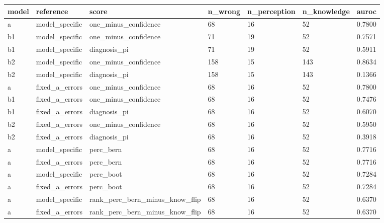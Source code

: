 \begin{tabular}{lllllll}
\hline
model & reference & score & n\_wrong & n\_perception & n\_knowledge & auroc \\
\hline
a & model\_specific & one\_minus\_confidence & 68 & 16 & 52 & 0.7800 \\
b1 & model\_specific & one\_minus\_confidence & 71 & 19 & 52 & 0.7571 \\
b1 & model\_specific & diagnosis\_pi & 71 & 19 & 52 & 0.5911 \\
b2 & model\_specific & one\_minus\_confidence & 158 & 15 & 143 & 0.8634 \\
b2 & model\_specific & diagnosis\_pi & 158 & 15 & 143 & 0.1366 \\
a & fixed\_a\_errors & one\_minus\_confidence & 68 & 16 & 52 & 0.7800 \\
b1 & fixed\_a\_errors & one\_minus\_confidence & 68 & 16 & 52 & 0.7476 \\
b1 & fixed\_a\_errors & diagnosis\_pi & 68 & 16 & 52 & 0.6070 \\
b2 & fixed\_a\_errors & one\_minus\_confidence & 68 & 16 & 52 & 0.5950 \\
b2 & fixed\_a\_errors & diagnosis\_pi & 68 & 16 & 52 & 0.3918 \\
a & model\_specific & perc\_bern & 68 & 16 & 52 & 0.7716 \\
a & fixed\_a\_errors & perc\_bern & 68 & 16 & 52 & 0.7716 \\
a & model\_specific & perc\_boot & 68 & 16 & 52 & 0.7284 \\
a & fixed\_a\_errors & perc\_boot & 68 & 16 & 52 & 0.7284 \\
a & model\_specific & rank\_perc\_bern\_minus\_know\_flip & 68 & 16 & 52 & 0.6370 \\
a & fixed\_a\_errors & rank\_perc\_bern\_minus\_know\_flip & 68 & 16 & 52 & 0.6370 \\
\hline
\end{tabular}
